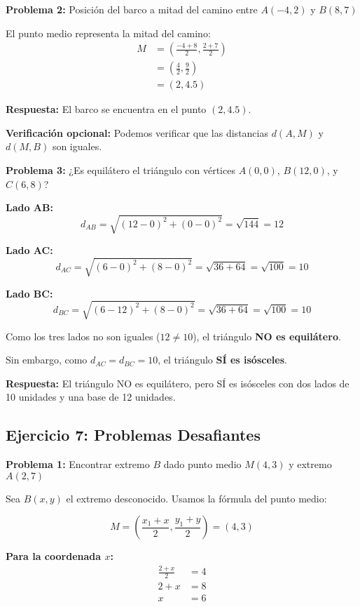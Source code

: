 \medskip

\textbf{Problema 2:} Posición del barco a mitad del camino entre $A(-4, 2)$ y $B(8, 7)$

El punto medio representa la mitad del camino:
\begin{align*}
M &= \left(\frac{-4 + 8}{2}, \frac{2 + 7}{2}\right) \\
  &= \left(\frac{4}{2}, \frac{9}{2}\right) \\
  &= \left(2, 4.5\right)
\end{align*}

\textbf{Respuesta:} El barco se encuentra en el punto $(2, 4.5)$.

\textbf{Verificación opcional:} Podemos verificar que las distancias $d(A,M)$ y $d(M,B)$ son iguales.

\medskip

\textbf{Problema 3:} ¿Es equilátero el triángulo con vértices $A(0, 0)$, $B(12, 0)$, y $C(6, 8)$?

\textbf{Lado AB:}
$$d_{AB} = \sqrt{(12-0)^2 + (0-0)^2} = \sqrt{144} = 12$$

\textbf{Lado AC:}
$$d_{AC} = \sqrt{(6-0)^2 + (8-0)^2} = \sqrt{36 + 64} = \sqrt{100} = 10$$

\textbf{Lado BC:}
$$d_{BC} = \sqrt{(6-12)^2 + (8-0)^2} = \sqrt{36 + 64} = \sqrt{100} = 10$$

Como los tres lados no son iguales ($12 \neq 10$), el triángulo \textbf{NO es equilátero}.

Sin embargo, como $d_{AC} = d_{BC} = 10$, el triángulo \textbf{SÍ es isósceles}.

\textbf{Respuesta:} El triángulo NO es equilátero, pero SÍ es isósceles con dos lados de 10 unidades y una base de 12 unidades.

\newpage

\subsection*{Ejercicio 7: Problemas Desafiantes}

\textbf{Problema 1:} Encontrar extremo $B$ dado punto medio $M(4, 3)$ y extremo $A(2, 7)$

Sea $B(x, y)$ el extremo desconocido. Usamos la fórmula del punto medio:

$$M = \left(\frac{x_1 + x}{2}, \frac{y_1 + y}{2}\right) = (4, 3)$$

\textbf{Para la coordenada $x$:}
\begin{align*}
\frac{2 + x}{2} &= 4 \\
2 + x &= 8 \\
x &= 6
\end{align*}

